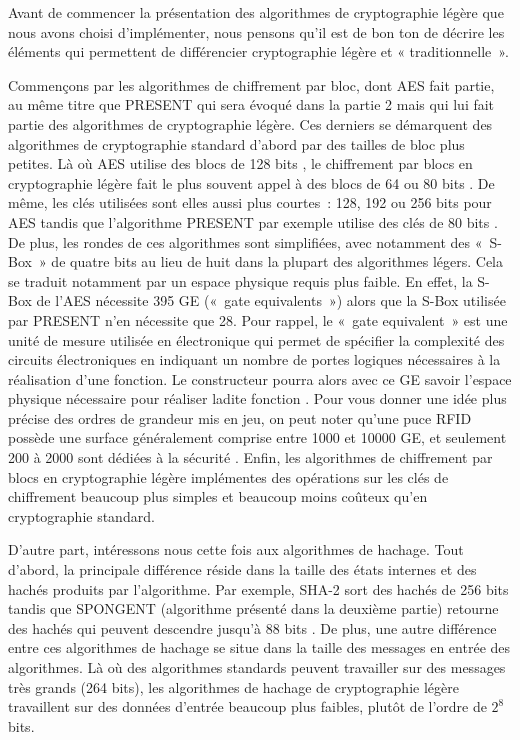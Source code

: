 			Avant de commencer la présentation des algorithmes de cryptographie légère que
		nous avons choisi d'implémenter, nous pensons qu'il est de bon ton de décrire
		les éléments qui permettent de différencier cryptographie légère et «
		traditionnelle ».

			Commençons par les algorithmes de chiffrement par bloc, dont AES fait partie,
		au même titre que PRESENT qui sera évoqué dans la partie 2 mais qui lui fait
		partie des algorithmes de cryptographie légère. Ces derniers se démarquent des
		algorithmes de cryptographie standard d'abord par des tailles de bloc plus
		petites. Là où AES utilise des blocs de 128 bits \cite{AES-FIPS}, le
		chiffrement par blocs en cryptographie légère fait le plus souvent appel à des
		blocs de 64 ou 80 bits \cite{Report_light}. De même, les clés utilisées sont
		elles aussi plus courtes : 128, 192 ou 256 bits pour AES \cite{AES-FIPS}
		tandis que l'algorithme PRESENT par exemple utilise des clés de 80 bits
		\cite{PRESENT}. De plus, les rondes de ces algorithmes sont simplifiées, avec
		notamment des « S-Box » de quatre bits au lieu de huit dans la plupart des
		algorithmes légers. Cela se traduit notamment par un espace physique requis
		plus faible. En effet, la S-Box de l'AES nécessite 395 GE \cite{RFID} (« gate
		equivalents ») alors que la S-Box utilisée par PRESENT n'en nécessite que 28.
		Pour rappel, le « gate equivalent » est une unité de mesure utilisée en
		électronique qui permet de spécifier la complexité des circuits électroniques
		en indiquant un nombre de portes logiques nécessaires à la réalisation d'une
		fonction. Le constructeur pourra alors avec ce GE savoir l'espace physique
		nécessaire pour réaliser ladite fonction \cite{wiki_gate}. Pour vous donner
		une idée plus précise des ordres de grandeur mis en jeu, on peut noter qu'une
		puce RFID possède une surface généralement comprise entre 1000 et 10000 GE, et
		seulement 200 à 2000 sont dédiées à la sécurité \cite{Report_light}. Enfin,
		les algorithmes de chiffrement par blocs en cryptographie légère implémentes
		des opérations sur les clés de chiffrement beaucoup plus simples et beaucoup
		moins coûteux qu'en cryptographie standard.

			D'autre part, intéressons nous cette fois aux algorithmes de hachage. Tout
		d'abord, la principale différence réside dans la taille des états internes et
		des hachés produits par l'algorithme. Par exemple, SHA-2 sort des hachés de
		256 bits tandis que SPONGENT (algorithme présenté dans la deuxième partie)
		retourne des hachés qui peuvent descendre jusqu'à 88 bits \cite{6275435}. De
		plus, une autre différence entre ces algorithmes de hachage se situe dans la
		taille des messages en entrée des algorithmes. Là où des algorithmes standards
		peuvent travailler sur des messages très grands (264 bits), les algorithmes de
		hachage de cryptographie légère travaillent sur des données d'entrée beaucoup
		plus faibles, plutôt de l'ordre de $2^8$ bits.

